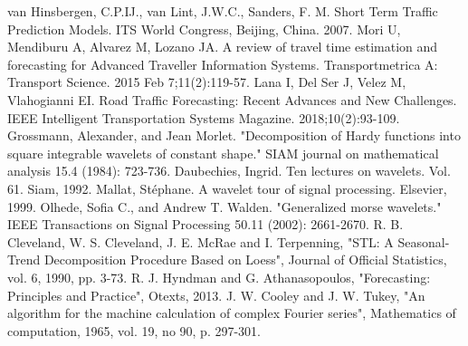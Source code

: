 \documentclass[a4paper, 10pt, conference]{ieeeconf}      %
\begin{document}
\begin{thebibliography}{00}
 van Hinsbergen, C.P.IJ., van Lint, J.W.C.,  Sanders, F. M. Short Term Traffic Prediction Models. ITS World Congress, Beijing, China. 2007.
 Mori U, Mendiburu A, Alvarez M, Lozano JA. A review of travel time estimation and forecasting for Advanced Traveller Information Systems. Transportmetrica A: Transport Science. 2015 Feb 7;11(2):119-57.
 Lana I, Del Ser J, Velez M, Vlahogianni EI. Road Traffic Forecasting: Recent Advances and New Challenges. IEEE Intelligent Transportation Systems Magazine. 2018;10(2):93-109.
 Grossmann, Alexander, and Jean Morlet. "Decomposition of Hardy functions into square integrable wavelets of constant shape." SIAM journal on mathematical analysis 15.4 (1984): 723-736.
 Daubechies, Ingrid. Ten lectures on wavelets. Vol. 61. Siam, 1992.
 Mallat, Stéphane. A wavelet tour of signal processing. Elsevier, 1999.
 Olhede, Sofia C., and Andrew T. Walden. "Generalized morse wavelets." IEEE Transactions on Signal Processing 50.11 (2002): 2661-2670.
 R. B. Cleveland, W. S. Cleveland, J. E. McRae and I. Terpenning, "STL: A Seasonal-Trend Decomposition Procedure Based on Loess", Journal of Official Statistics, vol. 6, 1990, pp. 3-73.
 R. J. Hyndman and G. Athanasopoulos, "Forecasting: Principles and Practice", Otexts, 2013.
 J. W. Cooley and J. W. Tukey, "An algorithm for the machine calculation of complex Fourier series", Mathematics of computation, 1965, vol. 19, no 90, p. 297-301.
\end{thebibliography}
\end{document}
